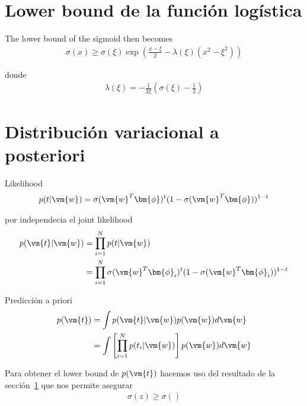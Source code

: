 \documentclass[a4paper,10pt]{article}
\newif\ifen
\newif\ifes
\newcommand{\en}[1]{\ifen#1\fi}
\newcommand{\es}[1]{\ifes#1\fi}
\begin{document}
\section{Lower bound de la funci\'on log\'istica}\label{sec:lower_bound}

\en{Here we shall make use of a Variational approximation based on local bounds, allowing the likelihood to be approximated by the exponential of a cuadratic form.}
\es{Aquí haremos uso de una aproximación variacional basada en acercamientos locales, permitiendo que la probabilidad sea aproximada por el exponencial de una forma cuadrática.}


The lower bound of the sigmoid then becomes
\begin{align}
 \sigma(x) \geq \sigma(\xi) \exp\left( \frac{x-\xi}{2} - \lambda(\xi)(x^2 - \xi^2) \right)
\end{align}

donde 
\begin{align}
 \lambda(\xi) = -\frac{1}{2\xi} \left( \sigma(\xi) - \frac{1}{2} \right)
\end{align}




\section{Distribuci\'on variacional a posteriori}

Likelihood
\begin{align*}
 p(t|\vm{w}) = \sigma(\vm{w}^T\bm{\phi})^t  (1-\sigma(\vm{w}^T\bm{\phi}))^{1-t}
\end{align*}

por independecia el joint likelihood
\begin{align*}
 p(\vm{t}|\vm{w}) & = \prod_{i=1}^N  p(t|\vm{w}) \\
 & = \prod_{i=1}^N  \sigma(\vm{w}^T\bm{\phi}_i)^t  (1-\sigma(\vm{w}^T\bm{\phi}_i))^{1-t}
\end{align*}

Predicci\'on a priori
\begin{align}
 p(\vm{t}) & = \int p(\vm{t}|\vm{w})p(\vm{w}) d\vm{w}  \\
 & = \int \left[ \prod_{i=1}^N p(t_i|\vm{w}) \right] p(\vm{w}) d\vm{w}
\end{align}

Para obtener el lower bound de $p(\vm{t})$ hacemos uso del resultado de la secci\'on~\ref{sec:lower_bound} que nos permite asegurar
\begin{align}
 \sigma(z) \geq \sigma()
\end{align}
\end{document}
